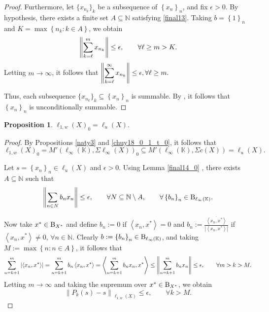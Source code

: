 \documentclass[14pt, a4paper]{article}  %
\providecommand{\llave}[1]{\left\lbrace #1\right\rbrace }
\providecommand{\pare}[1]{\left( #1\right) }
\providecommand{\norm}[1]{\left\lVert#1\right\rVert}
\providecommand{\abs}[1]{\left\lvert#1\right\rvert}
\providecommand{\Sum}[1]{\displaystyle\sum#1}
\newcommand{\tien}{\rightarrow}
\newcommand{\K}{\mathbb{K}}
\newcommand{\N}{\mathbb{N}}
\newcommand{\B}{\textup{B}}
\newcommand{\la}{\left\langle}
\newcommand{\ra}{\right\rangle}
\newtheorem{proposition}{Proposition}[section]
\begin{document}
\begin{proof}
 	Furthermore, let $\{x_{n_k}\}_{k}$ be a subsequence of $\llave{x_{n}}_{n}$, and fix $\epsilon>0$. By hypothesis, there exists a finite set $A\subseteq \N$ satisfying \eqref{final13}. Taking $b=\llave{1}_{n}$ and $K=\max\llave{n_{k}:k\in A}$, we obtain
 	\begin{equation}
 		\norm{\Sum_{k= \ell}^{m}x_{n_{k}}}\leq \epsilon,\qquad \forall \ell \geq m>K.
 	\end{equation}
 	Letting $m\tien \infty$, it follows that $\norm{\Sum_{k= \ell}^{\infty}x_{n_{k}}}\leq \epsilon, \forall \ell \geq m.$
 	
 	Thus, each subsequence $\{x_{n_k}\}_{k}\subseteq \llave{x_{n}}_{n}$ is summable. By \cite[p. 959]{Hi}, it follows that $\llave{x_{n}}_{n}$ is unconditionally summable.
 \end{proof}
 

 
\begin{proposition}
	$\ell_{1,w}\pare{X}_{0}= \ell_{u}\pare{X}$.
\end{proposition}
\begin{proof}
	By Propositions \ref{naty3} and \ref{chuy18_0_1_t_0}, it follows that
	\begin{equation}
		\ell_{1,w}\pare{X}_{0}= M'\pare{\ell_{\infty}\pare{\K},\Sigma \ell_{\infty}\pare{X}}_{0}\subseteq M'\pare{\ell_{\infty}\pare{\K},\Sigma c\pare{X}}=\ell_{u}\pare{X}.
	\end{equation}
	
	Let $s=\llave{x_{n}}_{n}\in \ell_{u}\pare{X}$ and $\epsilon>0$. Using Lemma \ref{final14_0} , there exists $A\subseteq \N$ such that
	\begin{equation}
		\norm{\Sum_{n\in N}b_{n}x_{n}}\leq\epsilon,\qquad \forall N\subseteq \N\setminus A,\qquad \forall \llave{b_{n}}_{n}\in \B_{\ell_{\infty}\pare{\K}}.
	\end{equation}
	
	Now take $x^{*}\in \B_{X^{*}}$ and define $b_{n}:=0$ if $\la x_{n},x^{*}\ra=0$ and $b_{n}:=\frac{\overline{\la x_{n},x^{*}\ra}}{\abs{\la x_{n},x^{*}\ra}}$ if $\la x_{n},x^{*}\ra\neq 0$, $\forall n\in \N$. Clearly $b:=\llave{b_{n}}_{n}\in \B_{\ell_{\infty}\pare{\K}}$, and taking $M:=\max\llave{n:n\in A}$, it follows that
	\begin{equation}
		\Sum_{n=k+1}^{m}\abs{\la x_{n},x^{*}\ra}=\Sum_{n=k+1}^{m}b_{n}\la x_{n},x^{*}\ra=\la\Sum_{n=k+1}^{m} b_{n}x_{n},x^{*}\ra \leq \norm{\Sum_{n=k+1}^{m} b_{n}x_{n}}\leq \epsilon,\qquad \forall m> k> M.
	\end{equation}
	Letting $m\to \infty$ and taking the supremum over $x^{*}\in \B_{X^{*}}$, we obtain
	\begin{equation}
		\norm{P_{k}\pare{s}-s}_{\ell_{1,w}\pare{X}} \leq \epsilon,\qquad \forall k>M.
	\end{equation}
\end{proof}
 
\end{document}
